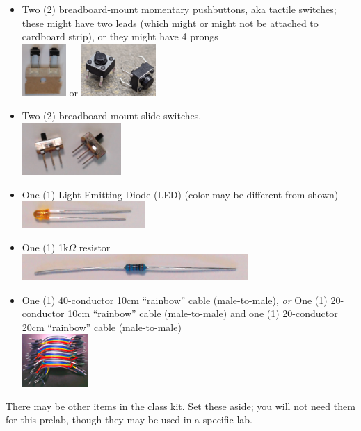 \begin{itemize}
    \item Two (2) breadboard-mount momentary pushbuttons, aka tactile switches;
        these might have two leads (which might or might not be attached to cardboard strip), or they might have 4 prongs \\
        \includegraphics[height=2cm]{inventory/buttons-2pin} \hspace{1cm} or
        \hspace{1cm} \includegraphics[height=2cm]{inventory/buttons-4pin}
    \item Two (2) breadboard-mount slide switches. \\
        \includegraphics[height=2cm]{inventory/sliders-spdt}%
    \displaymoduleitem
    \item One (1) Light Emitting Diode (LED) (color may be different from shown) \\
        \includegraphics[height=1cm]{inventory/led}
    \item One (1) 1k$\Omega$ resistor \\
        \includegraphics[height=1cm]{inventory/resistor}
    \item One (1) 40-conductor 10cm ``rainbow'' cable (male-to-male), \textit{or} One (1) 20-conductor 10cm ``rainbow'' cable (male-to-male) and one (1) 20-conductor 20cm ``rainbow'' cable (male-to-male) \\
        \includegraphics[height=2cm]{inventory/mm-cable}
    \fmcableitem
\end{itemize}

There may be other items in the class kit.
Set these aside;
you will not need them for this prelab, though they may be used in a specific lab.
